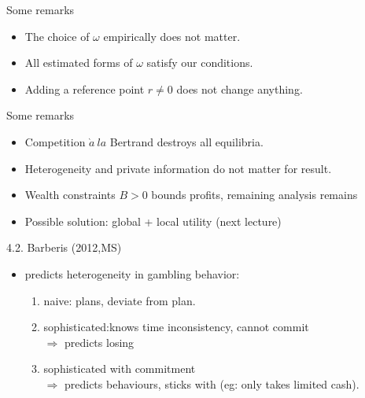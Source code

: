 \documentclass[11pt, aspectratio=169]{beamer}
\begin{document}
       \begin{frame}{Some remarks}
           \begin{itemize}
               \item The choice of $\omega$ empirically does not matter.\bigskip
               \item All estimated forms of $\omega$ satisfy our conditions.\bigskip
               \item Adding a reference point $r\neq 0$ does not change anything.\bigskip
           \end{itemize}
       \end{frame}

       \begin{frame}{Some remarks}
        \begin{itemize}
            \item Competition $\grave{a}~la$ Bertrand destroys all equilibria.\bigskip
            \item Heterogeneity and private information do not matter for result.\bigskip
            \item Wealth constraints $B>0$ bounds profits, remaining analysis remains\bigskip
            \item Possible solution: global + local utility (next lecture)\bigskip
        \end{itemize}
    \end{frame}



\begin{frame}{4.2. Barberis (2012,MS)}
    \begin{itemize}
        \item predicts heterogeneity in gambling behavior:\\
        \begin{enumerate}
            \item naive: plans, deviate from plan.\\
            \item sophisticated:knows time inconsistency, cannot commit\\
            $\Rightarrow$ predicts losing
            \item sophisticated with commitment\\
            $\Rightarrow$ predicts behaviours, sticks with (eg: only takes limited cash).\\
        \end{enumerate}
    \end{itemize}
\end{frame}
\end{document}
